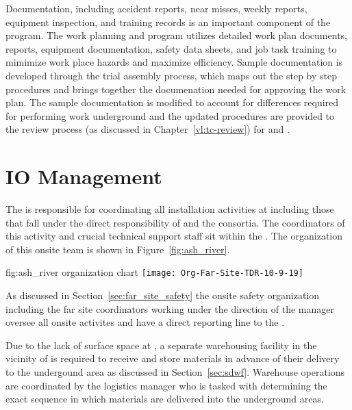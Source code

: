 Documentation, including accident reports, near misses, weekly
reports, equipment inspection, and training records is an important
component of the   program. The work
planning and  program utilizes detailed work plan documents,
 reports, equipment documentation, safety data sheets,
 and job task training to mimimize work place hazards and
maximize efficiency.  Sample documentation is developed through the
 trial assembly process, which maps out the step by
step procedures and brings together the documenation needed for
approving the work plan.  The sample documentation is modified to
account for differences required for performing work underground and
the updated procedures are provided to the review process (as
discussed in Chapter~\ref{vl:tc-review}) for  and
.

\section{IO Management}
\label{vl:tc-facility_mgmt}

The  is responsible for coordinating all installation
activities at  including those that fall under the 
direct responsibility of  and the  consortia.  
The coordinators of this activity and crucial technical support
staff sit within the .  The organization of this onsite team is 
shown in Figure~\ref{fig:ash_river}.
\begin{dunefigure}{fig:ash_river}
  { organization chart}
  \texttt{[image: Org-Far-Site-TDR-10-9-19]}
\end{dunefigure}
 
As discussed in Section~\ref{sec:far_site_safety} the onsite safety
organization including the far site  coordinators
working under the direction of the  
manager oversee all onsite activites and have a direct reporting line
to the .

Due to the lack of surface space at , a separate
warehousing facility in the vicinity of  is required to
receive and store materials in advance of their delivery to the
undergound area as discussed in Section~\ref{sec:sdwf}.  Warehouse
operations are coordinated by the  logistics manager
who is tasked with determining the exact sequence in which materials
are delivered into the underground areas.


